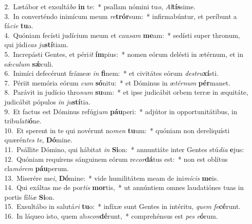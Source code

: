 {2.~}Lætábor et exsultá\textit{bo} \textbf{in} te:~* psallam nómini tu\textit{o}, \textit{Al}\textbf{tís}sime.\\
{3.~}In converténdo inimícum meum \textit{re}\textbf{trór}sum:~* infirmabúntur, et períbunt a fá\textit{ci}\textit{e} \textbf{tu}a.\\
{4.~}Quóniam fecísti judícium meum et cau\textit{sam} \textbf{me}am:~* sedísti super thronum, qui júdi\textit{cas} \textit{ju}\textbf{stí}tiam.\\
{5.~}Increpásti Gentes, et péri\textit{it} \textbf{ím}pius:~* nomen eórum delésti in ætérnum, et in sǽ\textit{cu}\textit{lum} \textbf{sǽ}culi.\\
{6.~}Inimíci defecérunt frámeæ \textit{in} \textbf{fi}nem:~* et civitátes eórum \textit{de}\textit{stru}\textbf{xí}sti.\\
{7.~}Périit memória eórum \textit{cum} \textbf{só}nitu:~* et Dóminus in æ\textit{tér}\textit{num} \textbf{pér}manet.\\
{8.~}Parávit in judício thro\textit{num} \textbf{su}um:~* et ipse judicábit orbem terræ in æquitáte, judicábit pópulos \textit{in} \textit{ju}\textbf{stí}tia.\\
{9.~}Et factus est Dóminus refúgi\textit{um} \textbf{páu}peri:~* adjútor in opportunitátibus, in tribu\textit{la}\textit{ti}\textbf{ó}ne.\\
{10.~}Et sperent in te qui novérunt no\textit{men} \textbf{tu}um:~* quóniam non dereliquísti quærén\textit{tes} \textit{te}, \textbf{Dó}mine.\\
{11.~}Psállite Dómino, qui hábitat \textit{in} \textbf{Si}on:~* annuntiáte inter Gentes stú\textit{di}\textit{a} \textbf{e}jus:\\
{12.~}Quóniam requírens sánguinem eórum re\textit{cor}\textbf{dá}tus est:~* non est oblítus cla\textit{mó}\textit{rem} \textbf{páu}perum.\\
{13.~}Miserére me\textit{i}, \textbf{Dó}mine:~* vide humilitátem meam de ini\textit{mí}\textit{cis} \textbf{me}is.\\
{14.~}Qui exáltas me de por\textit{tis} \textbf{mor}tis,~* ut annúntiem omnes laudatiónes tuas in portis fí\textit{li}\textit{æ} \textbf{Si}on.\\
{15.~}Exsultábo in salutá\textit{ri} \textbf{tu}o:~* infíxæ sunt Gentes in intéritu, \textit{quem} \textit{fe}\textbf{cé}runt.\\
{16.~}In láqueo isto, quem ab\textit{scon}\textbf{dé}runt,~* comprehénsus est \textit{pes} \textit{e}\textbf{ó}rum.\\
